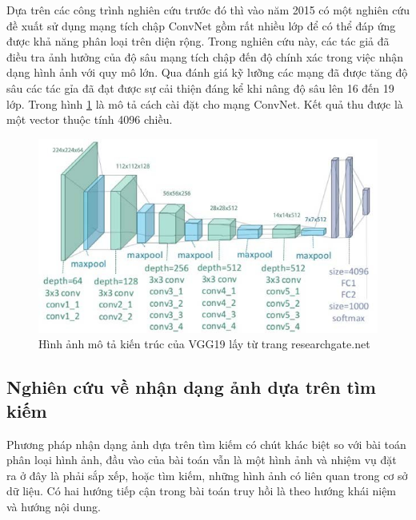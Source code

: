 \documentclass[12pt]{report}
\begin{document}
		Dựa trên các công trình nghiên cứu trước đó thì vào năm 2015 có một nghiên cứu \cite{cia_vgg19} đề xuất sử dụng mạng tích chập ConvNet \cite{cia_vgg19} gồm rất nhiều lớp để có thể đáp ứng được khả năng phân loại trên diện rộng. Trong nghiên cứu này, các tác giả đã điều tra ảnh hưởng của độ sâu mạng tích chập đến độ chính xác trong việc nhận dạng hình ảnh với quy mô lớn.												
		Qua đánh giá kỹ lưỡng các mạng đã được tăng độ sâu các tác gỉa đã đạt được sự cải thiện đáng kể khi nâng độ sâu lên 16 đến 19 lớp.
		Trong hình \ref{fig:vgg19_image} là mô tả cách cài đặt cho mạng ConvNet. Kết quả thu được là một vector thuộc tính 4096 chiều.
				\begin{figure}[h]
			\centering
			\includegraphics[scale=0.7]{vgg19_image}
			\caption{Hình ảnh mô tả kiến trúc của VGG19 \cite{cia_vgg19} lấy từ trang researchgate.net}
			\label{fig:vgg19_image}
		\end{figure}				\newpage
																								
		
																										
		\subsection{Nghiên cứu về nhận dạng ảnh dựa trên tìm kiếm}
																										
		Phương pháp nhận dạng ảnh dựa trên tìm kiếm \cite{image_retrival} có chút khác biệt so với bài toán phân loại hình ảnh, đầu vào của bài toán vẫn là một hình ảnh và nhiệm vụ đặt ra ở đây là phải sắp xếp, hoặc tìm kiếm, những hình ảnh có liên quan trong cơ sở dữ liệu. Có hai hướng tiếp cận trong bài toán truy hồi là theo hướng khái niệm và hướng nội dung.
																								
\end{document}

